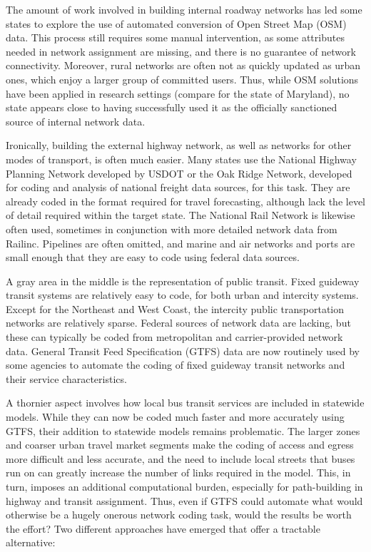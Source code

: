 The amount of work involved in building internal roadway networks has led some states to explore the use of automated conversion of Open Street Map (OSM) data. This process still requires some manual intervention, as some attributes needed in network assignment are missing, and there is no guarantee of network connectivity. Moreover, rural networks are often not as quickly updated as urban ones, which enjoy a larger group of committed users. Thus, while OSM solutions have been applied in research settings (compare \cite{ziemke16} for the state of Maryland), no state appears close to having successfully used it as the officially sanctioned source of internal network data.

Ironically, building the external highway network, as well as networks for other modes of transport, is often much easier. Many states use the National Highway Planning Network developed by USDOT or the Oak Ridge Network, developed for coding and analysis of national freight data sources, for this task. They are already coded in the format required for travel forecasting, although lack the level of detail required within the target state. The National Rail Network is likewise often used, sometimes in conjunction with more detailed network data from Railinc. Pipelines are often omitted, and marine and air networks and ports are small enough that they are easy to code using federal data sources.

A gray area in the middle is the representation of public transit. Fixed guideway transit systems are relatively easy to code, for both urban and intercity systems. Except for the Northeast and West Coast, the intercity public transportation networks are relatively sparse. Federal sources of network data are lacking, but these can typically be coded from metropolitan and carrier-provided network data. General Transit Feed Specification (GTFS) data are now routinely used by some agencies to automate the coding of fixed guideway transit networks and their service characteristics.

A thornier aspect involves how local bus transit services are included in statewide models. While they can now be coded much faster and more accurately using GTFS, their addition to statewide models remains problematic. The larger zones and coarser urban travel market segments make the coding of access and egress more difficult and less accurate, and the need to include local streets that buses run on can greatly increase the number of links required in the model. This, in turn, imposes an additional computational burden, especially for path-building in highway and transit assignment. Thus, even if GTFS could automate what would otherwise be a hugely onerous network coding task, would the results be worth the effort? Two different approaches have emerged that offer a tractable alternative:

